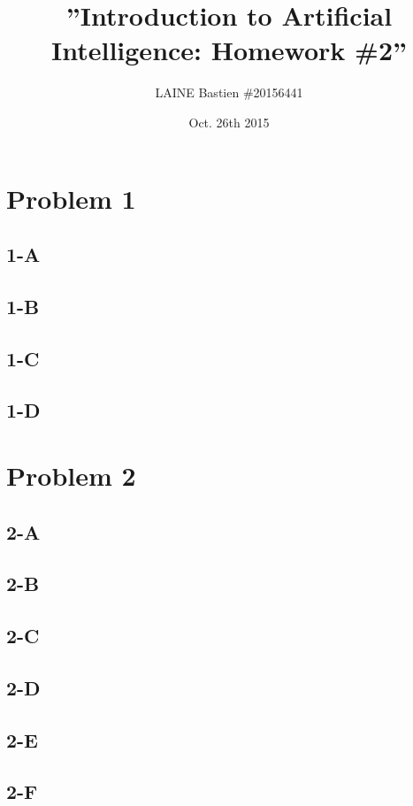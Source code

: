 \documentclass{article}
\begin{document}
    \title{\textbf{''Introduction to Artificial Intelligence: Homework \#2''}}
    \author{LAINE Bastien \#20156441}
    \date{Oct. 26th 2015}
    \maketitle
    \tableofcontents

    \newpage

    \section{Problem 1}
        \subsection{1-A}
        \subsection{1-B}
        \subsection{1-C}
        \subsection{1-D}
    \section{Problem 2}
        \subsection{2-A}
        \subsection{2-B}
        \subsection{2-C}
        \subsection{2-D}
        \subsection{2-E}
        \subsection{2-F}
\end{document}
